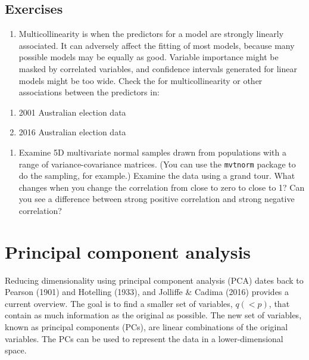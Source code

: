 \documentclass[
  letterpaper,
]{krantz}
\providecommand{\tightlist}{%
  \setlength{\itemsep}{0pt}\setlength{\parskip}{0pt}}\usepackage{longtable,booktabs,array}
\begin{document}
\hypertarget{exercises-2}{%
\section*{Exercises}\label{exercises-2}}


\begin{enumerate}
\def\labelenumi{\arabic{enumi}.}
\tightlist
\item
  Multicollinearity is when the predictors for a model are strongly
  linearly associated. It can adversely affect the fitting of most
  models, because many possible models may be equally as good. Variable
  importance might be masked by correlated variables, and confidence
  intervals generated for linear models might be too wide. Check the for
  multicollinearity or other associations between the predictors in:
\end{enumerate}

\begin{enumerate}
\def\labelenumi{\alph{enumi}.}
\tightlist
\item
  2001 Australian election data
\item
  2016 Australian election data
\end{enumerate}

\begin{enumerate}
\def\labelenumi{\arabic{enumi}.}
\setcounter{enumi}{1}
\tightlist
\item
  Examine 5D multivariate normal samples drawn from populations with a
  range of variance-covariance matrices. (You can use the
  \texttt{mvtnorm} package to do the sampling, for example.) Examine the
  data using a grand tour. What changes when you change the correlation
  from close to zero to close to 1? Can you see a difference between
  strong positive correlation and strong negative correlation?
\end{enumerate}

\hypertarget{principal-component-analysis}{%
\chapter{Principal component
analysis}\label{principal-component-analysis}}

Reducing dimensionality using principal component analysis (PCA) dates
back to Pearson (1901) and Hotelling (1933), and Jolliffe \& Cadima
(2016) provides a current overview. The goal is to find a smaller set of
variables, \(q (< p)\), that contain as much information as the original
as possible. The new set of variables, known as principal components
(PCs), are linear combinations of the original variables. The PCs can be
used to represent the data in a lower-dimensional space.
\end{document}
